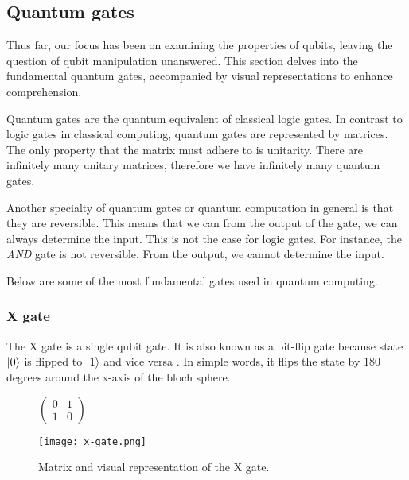 \subsection{Quantum gates}
Thus far, our focus has been on examining the properties of qubits, leaving the question of qubit manipulation unanswered. This section delves into the fundamental quantum gates, accompanied by visual representations to enhance comprehension.

Quantum gates are the quantum equivalent of classical logic gates. In contrast to logic gates in classical computing, quantum gates are represented by matrices. The only property that the matrix must adhere to is unitarity. There are infinitely many unitary matrices, therefore we have infinitely many quantum gates. \cite{qc}

Another specialty of quantum gates or quantum computation in general is that they are reversible. This means that we can from the output of the gate, we can always determine the input. This is not the case for logic gates. For instance, the \textit{AND} gate is not reversible. From the output, we cannot determine the input. \cite{qc}

Below are some of the most fundamental gates used in quantum computing.
\subsubsection{X gate}
The X gate is a single qubit gate. It is also known as a bit-flip gate because state $\lvert0\rangle$ is flipped to $\lvert1\rangle$ and vice versa \cite{qc}. In simple words, it flips the state by 180 degrees around the x-axis of the bloch sphere.

\begin{figure}[H]
    \centering
    \begin{minipage}{0.4\linewidth}
      \centering
      $\begin{pmatrix}
        0 & 1 \\
        1 & 0
        \end{pmatrix}$
      \vfill
    \end{minipage}
    \begin{minipage}{0.25\linewidth}
      \centering
      \texttt{[image: x-gate.png]}
      \vfill
    \end{minipage}
    \caption{Matrix and visual representation of the X gate.}
\end{figure}


